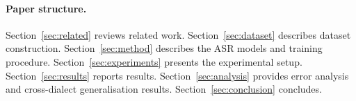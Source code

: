 \paragraph{Paper structure.}
Section~\ref{sec:related} reviews related work.
Section~\ref{sec:dataset} describes dataset construction.
Section~\ref{sec:method} describes the ASR models and training procedure.
Section~\ref{sec:experiments} presents the experimental setup.
Section~\ref{sec:results} reports results.
Section~\ref{sec:analysis} provides error analysis and cross-dialect
generalisation results.
Section~\ref{sec:conclusion} concludes.
